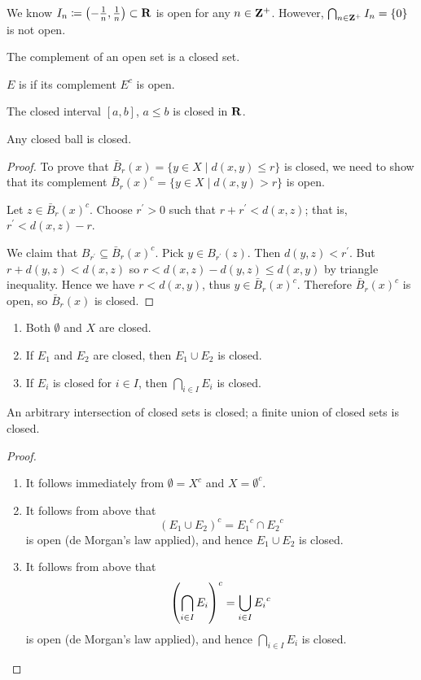 \begin{example}
We know $I_n\coloneqq\left(-\frac{1}{n},\frac{1}{n}\right)\subset\mathbf R$ is open for any $n\in\mathbf Z^+$. However, $\bigcap_{n\in\mathbf Z^+}I_n=\{0\}$ is not open.
\end{example}

The complement of an open set is a closed set.

\begin{definition}
$E$ is  if its complement $E^c$ is open.
\end{definition}

\begin{example}
The closed interval $[a,b]$, $a\le b$ is closed in $\mathbf R$.
\end{example}

\begin{proposition}
Any closed ball is closed.
\end{proposition}

\begin{proof}
To prove that $\bar{B}_r(x)=\{y\in X\mid d(x,y)\le r\}$ is closed, we need to show that its complement $\bar{B}_r(x)^c=\{y\in X\mid d(x,y)>r\}$ is open.

Let $z\in\bar{B}_r(x)^c$. Choose $r^\prime>0$ such that $r+r^\prime<d(x,z)$; that is, $r^\prime<d(x,z)-r$.

We claim that $B_{r^\prime}\subseteq\bar{B}_r(x)^c$. Pick $y\in B_{r^\prime}(z)$. Then $d(y,z)<r^\prime$. But $r+d(y,z)<d(x,z)$ so $r<d(x,z)-d(y,z)\le d(x,y)$ by triangle inequality. Hence we have $r<d(x,y)$, thus $y\in\bar{B}_r(x)^c$. Therefore $\bar{B}_r(x)^c$ is open, so $\bar{B}_r(x)$ is closed.
\end{proof}

\begin{proposition}
\begin{enumerate}[label=(\arabic*)]
\item Both $\emptyset$ and $X$ are closed.
\item If $E_1$ and $E_2$ are closed, then $E_1\cup E_2$ is closed.
\item If $E_i$ is closed for $i\in I$, then $\bigcap_{i\in I}E_i$ is closed.
\end{enumerate}
\end{proposition}

An arbitrary intersection of closed sets is closed; a finite union of closed sets is closed.

\begin{proof} \
\begin{enumerate}[label=(\arabic*)]
\item It follows immediately from $\emptyset=X^c$ and $X=\emptyset^c$.
\item It follows from above that
\[ (E_1\cup E_2)^c={E_1}^c\cap {E_2}^c \]
is open (de Morgan's law applied), and hence $E_1\cup E_2$ is closed.
\item It follows from above that
\[ \left(\bigcap_{i\in I}E_i\right)^c=\bigcup_{i\in I}{E_i}^c \]
is open (de Morgan's law applied), and hence $\bigcap_{i\in I}E_i$ is closed.
\end{enumerate}
\end{proof}

